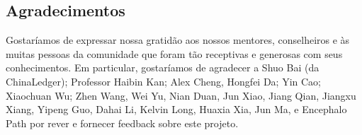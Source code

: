 \documentclass[UTF8,nofonts]{article}
\begin{document}
\begin{multicols}{2}
\section{Agradecimentos}
Gostaríamos de expressar nossa gratidão aos nossos mentores, conselheiros e às muitas pessoas da comunidade que foram tão receptivas e generosas com seus conhecimentos. Em particular, gostaríamos de agradecer a Shuo Bai (da ChinaLedger); Professor Haibin Kan; Alex Cheng, Hongfei Da; Yin Cao; Xiaochuan Wu; Zhen Wang, Wei Yu, Nian Duan, Jun Xiao, Jiang Qian, Jiangxu Xiang, Yipeng Guo, Dahai Li, Kelvin Long, Huaxia Xia, Jun Ma, e Encephalo Path por rever e fornecer feedback sobre este projeto.






\end{multicols}
\end{document}
